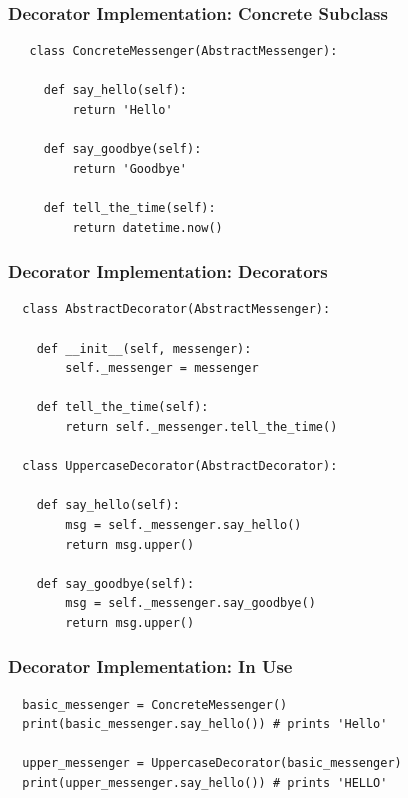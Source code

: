 \documentclass[10pt]{beamer}
\begin{document}
\begin{frame}[fragile]
  \frametitle{Decorator Implementation: Concrete Subclass }

  \begin{verbatim}
   class ConcreteMessenger(AbstractMessenger):

     def say_hello(self):
         return 'Hello'

     def say_goodbye(self):
         return 'Goodbye'

     def tell_the_time(self):
         return datetime.now()

  \end{verbatim}
 \end{frame} 

\begin{frame}[fragile]
  \frametitle{Decorator Implementation: Decorators }

  \begin{verbatim}
  class AbstractDecorator(AbstractMessenger):
   
    def __init__(self, messenger):
        self._messenger = messenger

    def tell_the_time(self):
        return self._messenger.tell_the_time()
        
  class UppercaseDecorator(AbstractDecorator):
  
    def say_hello(self):
        msg = self._messenger.say_hello()
        return msg.upper()

    def say_goodbye(self):
        msg = self._messenger.say_goodbye()
        return msg.upper()      
  \end{verbatim}
 \end{frame} 

\begin{frame}[fragile]
  \frametitle{Decorator Implementation: In Use}

  \begin{verbatim}
  basic_messenger = ConcreteMessenger()
  print(basic_messenger.say_hello()) # prints 'Hello'
  
  upper_messenger = UppercaseDecorator(basic_messenger)
  print(upper_messenger.say_hello()) # prints 'HELLO'
  \end{verbatim}
 \end{frame} 
\end{document}
